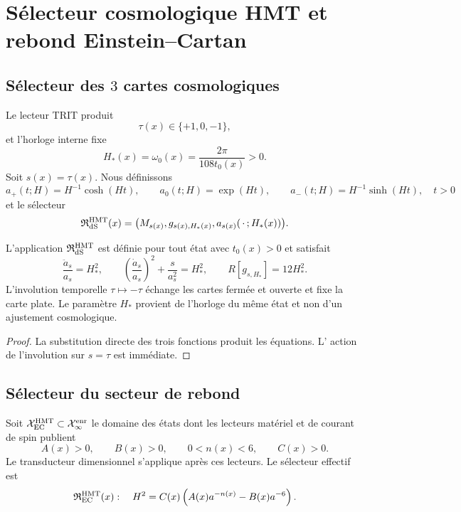 \section{Sélecteur cosmologique HMT et rebond Einstein--Cartan}
\label{sec:hmtf2-selector-cosmologico}

\subsection{Sélecteur des \(3\) cartes cosmologiques}

Le lecteur TRIT produit
\[
 \tau(x)\in\{+1,0,-1\},
\]
et l'horloge interne fixe
\[
 H_*(x)=\omega_0(x)=\frac{2\pi}{108t_0(x)}>0.
\]
Soit \(s(x)=\tau(x)\). Nous définissons
\[
 a_{+}(t;H)=H^{-1}\cosh(Ht),\qquad
 a_0(t;H)=\exp(Ht),\qquad
 a_{-}(t;H)=H^{-1}\sinh(Ht),\quad t>0
\]
et le sélecteur
\[
 \mathfrak R_{\rm dS}^{\rm HMT}(x)
 =\bigl(M_{s(x)},g_{s(x),H_*(x)},a_{s(x)}(\,\cdot\,;H_*(x))\bigr).
\]

\begin{theorem}
\label{thm:hmtf2-selector-ds}
L'application \(\mathfrak R_{\rm dS}^{\rm HMT}\) est définie pour tout état
avec \(t_0(x)>0\) et satisfait
\[
 \frac{\ddot a_s}{a_s}=H_*^2,\qquad
 \left(\frac{\dot a_s}{a_s}\right)^2+\frac{s}{a_s^2}=H_*^2,
 \qquad
 R[g_{s,H_*}]=12H_*^2.
\]
L'involution temporelle \(\tau\mapsto-\tau\) échange les cartes fermée et
ouverte et fixe la carte plate. Le paramètre \(H_*\) provient de l'horloge du même
état et non d'un ajustement cosmologique.
\end{theorem}

\begin{proof}
La substitution directe des trois fonctions produit les équations. L'
action de l'involution sur \(s=\tau\) est immédiate.
\end{proof}

\subsection{Sélecteur du secteur de rebond}

Soit \(\mathcal X_{\rm EC}^{\rm HMT}\subset\mathcal X_\infty^{\rm enr}\) le
domaine des états dont les lecteurs matériel et de courant de spin publient
\[
 A(x)>0,\qquad B(x)>0,\qquad 0<n(x)<6,\qquad C(x)>0.
\]
Le transducteur dimensionnel s'applique après ces lecteurs. Le sélecteur
effectif est
\[
 \mathfrak R_{\rm EC}^{\rm HMT}(x):
 \quad
 H^2=C(x)\left(A(x)a^{-n(x)}-B(x)a^{-6}\right).
\]

